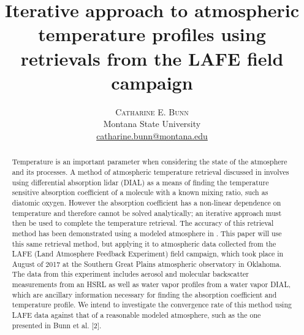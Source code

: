 \documentclass[twoside]{article}
\title{\vspace{-15mm}\fontsize{22pt}{10pt}\selectfont\textbf{Iterative approach to atmospheric temperature profiles using retrievals from the LAFE field campaign}} %
\author{
\large
\textsc{Catharine E. Bunn}\\[2mm] %
\normalsize Montana State University \\ %
\normalsize \href{mailto:catharine.bunn@montana.edu}{catharine.bunn@montana.edu} %
\vspace{-5mm}
}
\date{}
\begin{document}
\maketitle %

\thispagestyle{fancy} %




\begin{abstract}
Temperature is an important parameter when considering the state of the atmosphere and its processes. 
A method of atmospheric temperature retrieval discussed in \citet{Bosenberg1998} involves using differential absorption lidar (DIAL) as a means of finding the temperature sensitive absorption coefficient of a molecule with a known mixing ratio, such as diatomic oxygen. 
However the absorption coefficient has a non-linear dependence on temperature and therefore cannot be solved analytically; an iterative approach must then be used to complete the temperature retrieval.
 The accuracy of this retrieval method has been demonstrated using a modeled atmosphere in \citet{Bunn2018}. 
 This paper will use this same retrieval method, but applying it to atmospheric data collected from the LAFE (Land Atmosphere Feedback Experiment) field campaign, which took place in August of 2017 at the Southern Great Plains atmospheric observatory in Oklahoma. 
 The data from this experiment includes aerosol and molecular backscatter measurements from an HSRL as well as water vapor profiles from a water vapor DIAL, which are ancillary information necessary for finding the absorption coefficient and temperature profile.
 We intend to investigate the convergence rate of this method using LAFE data against that of a reasonable modeled atmosphere, such as the one presented in Bunn et al. [2].
\end{abstract}
\end{document}
